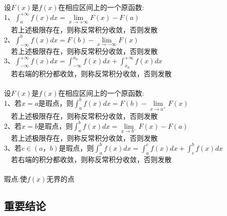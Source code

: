 \documentclass{article}
\begin{document}
\begin{flushleft}
	设$F(x)$是$f(x)$在相应区间上的一个原函数:\\
	1、$\int_{a}^{+\infty}f(x)dx=\lim\limits_{x\to+\infty}F(x)-F(a)$\\
	\ \ 若上述极限存在，则称反常积分收敛，否则发散\\
	2、$\int_{-\infty}^{b}f(x)dx=F(b)-\lim\limits_{x\to-\infty}F(x)$\\
	\ \ 若上述极限存在，则称反常积分收敛，否则发散\\
	3、$\int_{-\infty}^{+\infty}f(x)dx=\int_{-\infty}^{x_0}f(x)dx+\int_{x_0}^{+\infty}f(x)dx$\\
	\ \ 若右端的积分都收敛，则称反常积分收敛，否则发散\\
	~\\
	设$F(x)$是$f(x)$在相应区间上的一个原函数:\\
	1、若$x=a$是瑕点，则$\int_{a}^{b}f(x)dx=F(b)-\lim\limits_{x\to a^+}F(x)$\\
	\ \ 若上述极限存在，则称反常积分收敛，否则发散\\
	2、若$x=b$是瑕点，则$\int_{a}^{b}f(x)dx=\lim\limits_{x\to b^-}F(x)-F(a)$\\
	\ \ 若上述极限存在，则称反常积分收敛，否则发散\\
	3、若$c\in(a，b)$是瑕点，则$\int_{a}^{b}f(x)dx=\int_{a}^{c}f(x)dx+\int_{c}^{b}f(x)dx$\\
	\ \ 若右端的积分都收敛，则称反常积分收敛，否则发散\\
	~\\
	瑕点:使$f(x)$无界的点\\
	
	\subsection{重要结论}
	

\end{flushleft}
\end{document}
